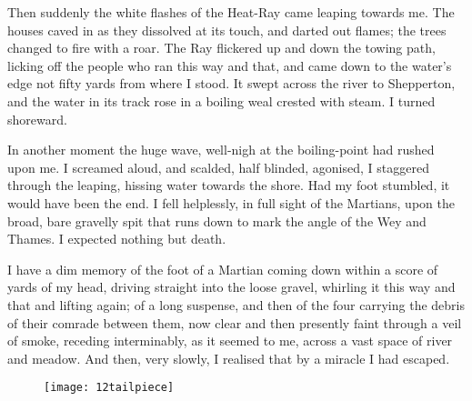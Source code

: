 Then suddenly the white flashes of the Heat-Ray came leaping towards me. The houses caved in as they dissolved at its touch, and darted out flames; the trees changed to fire with a roar. The Ray flickered up and down the towing path, licking off the people who ran this way and that, and came down to the water's edge not fifty yards from where I stood. It swept across the river to Shepperton, and the water in its track rose in a boiling weal crested with steam. I turned shoreward.

In another moment the huge wave, well-nigh at the boiling-point had rushed upon me. I screamed aloud, and scalded, half blinded, agonised, I staggered through the leaping, hissing water towards the shore. Had my foot stumbled, it would have been the end. I fell helplessly, in full sight of the Martians, upon the broad, bare gravelly spit that runs down to mark the angle of the Wey and Thames. I expected nothing but death.

I have a dim memory of the foot of a Martian coming down within a score of yards of my head, driving straight into the loose gravel, whirling it this way and that and lifting again; of a long suspense, and then of the four carrying the debris of their comrade between them, now clear and then presently faint through a veil of smoke, receding interminably, as it seemed to me, across a vast space of river and meadow. And then, very slowly, I realised that by a miracle I had escaped.

\begin{figure}[b!]
\centering
\texttt{[image: 12tailpiece]}
\end{figure}